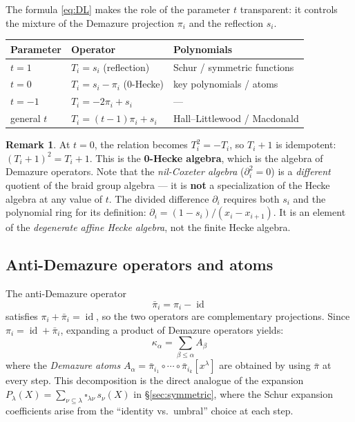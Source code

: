 \documentclass[11pt]{amsart}
\theoremstyle{definition}
\newtheorem{remark}[theorem]{Remark}
\DeclareMathOperator{\id}{id}
\begin{document}
The formula \eqref{eq:DL} makes the role of the parameter $t$
transparent: it controls the mixture of the Demazure projection
$\pi_i$ and the reflection $s_i$.

\medskip
\begin{center}
\renewcommand{\arraystretch}{1.3}
\begin{tabular}{lll}
\toprule
\textbf{Parameter} & \textbf{Operator} & \textbf{Polynomials} \\
\midrule
$t = 1$ & $T_i = s_i$ (reflection) &
  Schur / symmetric functions \\
$t = 0$ & $T_i = s_i - \pi_i$ (0-Hecke) &
  key polynomials / atoms \\
$t = -1$ & $T_i = -2\pi_i + s_i$ &
  --- \\
general $t$ & $T_i = (t-1)\pi_i + s_i$ &
  Hall--Littlewood / Macdonald \\
\bottomrule
\end{tabular}
\end{center}

\begin{remark}\label{rmk:0hecke}
  At $t = 0$, the relation becomes $T_i^2 = -T_i$, so $T_i + 1$
  is idempotent: $(T_i + 1)^2 = T_i + 1$. This is the
  \textbf{0-Hecke algebra}, which is the algebra of Demazure
  operators. Note that the \emph{nil-Coxeter algebra}
  ($\partial_i^2 = 0$) is a \emph{different} quotient of the braid
  group algebra --- it is \textbf{not} a specialization of the Hecke
  algebra at any value of $t$. The divided difference $\partial_i$
  requires both $s_i$ and the polynomial ring for its definition:
  $\partial_i = (1 - s_i)/(x_i - x_{i+1})$. It is an element of
  the \emph{degenerate affine Hecke algebra}, not the finite Hecke
  algebra.
\end{remark}

\subsection{Anti-Demazure operators and atoms}

The anti-Demazure operator
\[
  \bar{\pi}_i = \pi_i - \id
\]
satisfies $\pi_i + \bar{\pi}_i = \id$, so the two operators are
complementary projections. Since $\pi_i = \id + \bar{\pi}_i$,
expanding a product of Demazure operators yields:
\[
  \kappa_\alpha = \sum_{\beta \leq \alpha} A_\beta
\]
where the \emph{Demazure atoms}
$A_\alpha = \bar{\pi}_{i_1} \circ \cdots \circ
\bar{\pi}_{i_k}[x^\lambda]$ are obtained by using
$\bar{\pi}$ at every step. This decomposition is the direct
analogue of the expansion $P_\lambda(X) = \sum_{\nu \subseteq
\lambda} \square_{\lambda\nu}\, s_\nu(X)$ in
\S\ref{sec:symmetric}, where the Schur expansion coefficients
arise from the ``identity vs.\ umbral'' choice at each step.
\end{document}
